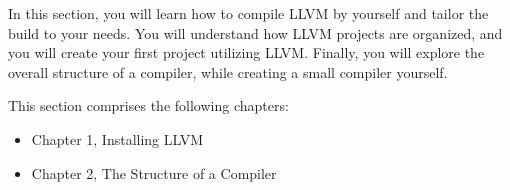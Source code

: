 In this section, you will learn how to compile LLVM by yourself and tailor the build to your needs. You will understand how LLVM projects are organized, and you will create your first project utilizing LLVM.
Finally, you will explore the overall structure of a compiler, while creating a small compiler yourself.

This section comprises the following chapters:

\begin{itemize}
\item 
Chapter 1, Installing LLVM

\item 
Chapter 2, The Structure of a Compiler
\end{itemize}
